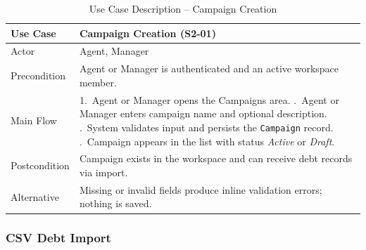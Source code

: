 \documentclass[12pt,a4paper]{report}
\newcommand{\reporttablesetup}{%
  \small%
  \setlength{\tabcolsep}{5pt}%
  \renewcommand{\arraystretch}{1.22}%
  \arrayrulecolor{framegray}%
}
\begin{document}
\begin{table}[H]
  \centering
  \reporttablesetup
  \begin{tabularx}{\textwidth}{|p{3.1cm}|Y|}
    \hline
    Use Case     & Campaign Creation (S2-01) \\
    \hline
    Actor        & Agent, Manager \\
    \hline
    Precondition & Agent or Manager is authenticated and an active workspace member. \\
    \hline
    Main Flow    & 1.\ Agent or Manager opens the Campaigns area. .\ Agent or Manager enters campaign name and optional description.
                       .\ System validates input and persists the \texttt{Campaign}
                       record. .\ Campaign appears in the list with status \textit{Active} or
                       \textit{Draft}. \\
    \hline
    Postcondition & Campaign exists in the workspace and can receive debt records via
                   import. \\
    \hline
    Alternative  & Missing or invalid fields produce inline validation errors; nothing
                   is saved. \\
    \hline
  \end{tabularx}
  \caption{Use Case Description -- Campaign Creation}
  \label{tab:uc-s2-01}
\end{table}

\subsubsection{CSV Debt Import}
\end{document}
